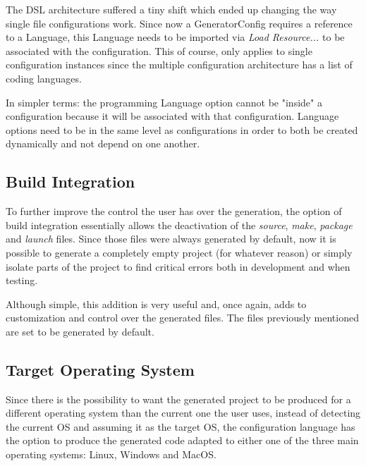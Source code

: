 The \gls{DSL} architecture suffered a tiny shift which ended up changing the way single file configurations work. Since now a GeneratorConfig requires a reference to a Language, this Language needs to be imported via \textit{Load Resource...} to be associated with the configuration. This of course, only applies to single configuration instances since the multiple configuration architecture has a list of coding languages.


\begin{tcolorbox}[colback=green!5, colframe=green!40!black] In simpler terms: the programming Language option cannot be "inside" a configuration because it will be associated with that configuration. Language options need to be in the same level as configurations in order to both be created dynamically and not depend on one another. \end{tcolorbox}



 


\subsection{Build Integration}
\label{sec:impl_build_options}

To further improve the control the user has over the generation, the option of build integration essentially allows the deactivation of the \textit{source}, \textit{make}, \textit{package} and \textit{launch} files. Since those files were always generated by default, now it is possible to generate a completely empty project (for whatever reason) or simply isolate parts of the project to find critical errors both in development and when testing.

Although simple, this addition is very useful and, once again, adds to customization and control over the generated files. The files previously mentioned are set to be generated by default.


\subsection{Target Operating System}
\label{sec:impl_os}

Since there is the possibility to want the generated project to be produced for a different operating system than the current one the user uses, instead of detecting the current \gls{OS} and assuming it as the target \gls{OS}, the configuration language has the option to produce the generated code adapted to either one of the three main operating systems: Linux, Windows and MacOS.

